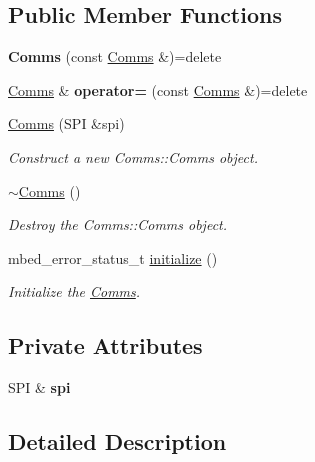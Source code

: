 \subsection*{Public Member Functions}
\begin{DoxyCompactItemize}
\item 
\mbox{\label{class_comms_a0460baf6818aab9ec44fb3e954700855}} 
{\bfseries Comms} (const \mbox{\hyperlink{class_comms}{Comms}} \&)=delete
\item 
\mbox{\label{class_comms_a0206d824817361e0f9f95b1d61d24754}} 
\mbox{\hyperlink{class_comms}{Comms}} \& {\bfseries operator=} (const \mbox{\hyperlink{class_comms}{Comms}} \&)=delete
\item 
\mbox{\hyperlink{class_comms_a84e488377d67eaf90750e8dc0c64f947}{Comms}} (S\+PI \&spi)
\begin{DoxyCompactList}\small\item\em Construct a new Comms\+::\+Comms object. \end{DoxyCompactList}\item 
\mbox{\hyperlink{class_comms_ad18d3a80a82d18d27b0de3b551e4f5fc}{$\sim$\+Comms}} ()
\begin{DoxyCompactList}\small\item\em Destroy the Comms\+::\+Comms object. \end{DoxyCompactList}\item 
mbed\+\_\+error\+\_\+status\+\_\+t \mbox{\hyperlink{class_comms_adf638922e6c53bef0fab4f482775f072}{initialize}} ()
\begin{DoxyCompactList}\small\item\em Initialize the \mbox{\hyperlink{class_comms}{Comms}}. \end{DoxyCompactList}\end{DoxyCompactItemize}
\subsection*{Private Attributes}
\begin{DoxyCompactItemize}
\item 
\mbox{\label{class_comms_ae2828ae3b03acb030cffa964cae95cfb}} 
S\+PI \& {\bfseries spi}
\end{DoxyCompactItemize}


\subsection{Detailed Description}


